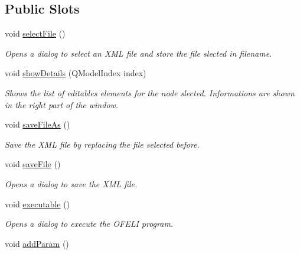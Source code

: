 \subsection*{Public Slots}
\begin{DoxyCompactItemize}
\item 
\hypertarget{classMainWindow_a2ae51e1e864469c364b0f8ca9f001926}{void \hyperlink{classMainWindow_a2ae51e1e864469c364b0f8ca9f001926}{select\-File} ()}\label{classMainWindow_a2ae51e1e864469c364b0f8ca9f001926}

\begin{DoxyCompactList}\small\item\em Opens a dialog to select an X\-M\-L file and store the file slected in filename. \end{DoxyCompactList}\item 
void \hyperlink{classMainWindow_a91bb6afc2332387aabd2c56a060cea2e}{show\-Details} (Q\-Model\-Index index)
\begin{DoxyCompactList}\small\item\em Shows the list of editables elements for the node slected. Informations are shown in the right part of the window. \end{DoxyCompactList}\item 
\hypertarget{classMainWindow_a1725a0bf1d276bb1fbc57ef669d73208}{void \hyperlink{classMainWindow_a1725a0bf1d276bb1fbc57ef669d73208}{save\-File\-As} ()}\label{classMainWindow_a1725a0bf1d276bb1fbc57ef669d73208}

\begin{DoxyCompactList}\small\item\em Save the X\-M\-L file by replacing the file selected before. \end{DoxyCompactList}\item 
\hypertarget{classMainWindow_a464aaa4d378e7b2d814756a73d6e1ed6}{void \hyperlink{classMainWindow_a464aaa4d378e7b2d814756a73d6e1ed6}{save\-File} ()}\label{classMainWindow_a464aaa4d378e7b2d814756a73d6e1ed6}

\begin{DoxyCompactList}\small\item\em Opens a dialog to save the X\-M\-L file. \end{DoxyCompactList}\item 
\hypertarget{classMainWindow_a99d6bd9b5763e598eed579cd670d1298}{void \hyperlink{classMainWindow_a99d6bd9b5763e598eed579cd670d1298}{executable} ()}\label{classMainWindow_a99d6bd9b5763e598eed579cd670d1298}

\begin{DoxyCompactList}\small\item\em Opens a dialog to execute the O\-F\-E\-L\-I program. \end{DoxyCompactList}\item 
\hypertarget{classMainWindow_a961f84bb1d476d689527e925d06133f3}{void \hyperlink{classMainWindow_a961f84bb1d476d689527e925d06133f3}{add\-Param} ()}\label{classMainWindow_a961f84bb1d476d689527e925d06133f3}


\end{DoxyCompactItemize}
